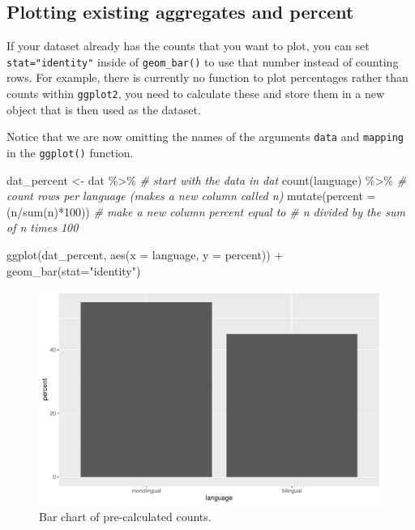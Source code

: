 \documentclass[
  english,
  doc,floatsintext]{apa6}
\newenvironment{Shaded}{\begin{snugshade}}{\end{snugshade}}
\newcommand{\AttributeTok}[1]{\textcolor[rgb]{0.77,0.63,0.00}{#1}}
\newcommand{\CommentTok}[1]{\textcolor[rgb]{0.56,0.35,0.01}{\textit{#1}}}
\newcommand{\DecValTok}[1]{\textcolor[rgb]{0.00,0.00,0.81}{#1}}
\newcommand{\FunctionTok}[1]{\textcolor[rgb]{0.00,0.00,0.00}{#1}}
\newcommand{\NormalTok}[1]{#1}
\newcommand{\OtherTok}[1]{\textcolor[rgb]{0.56,0.35,0.01}{#1}}
\newcommand{\SpecialCharTok}[1]{\textcolor[rgb]{0.00,0.00,0.00}{#1}}
\newcommand{\StringTok}[1]{\textcolor[rgb]{0.31,0.60,0.02}{#1}}
\begin{document}
\hypertarget{plotting-existing-aggregates-and-percent}{%
\subsection{Plotting existing aggregates and percent}\label{plotting-existing-aggregates-and-percent}}

If your dataset already has the counts that you want to plot, you can set \texttt{stat="identity"} inside of \texttt{geom\_bar()} to use that number instead of counting rows. For example, there is currently no function to plot percentages rather than counts within \texttt{ggplot2}, you need to calculate these and store them in a new object that is then used as the dataset.

Notice that we are now omitting the names of the arguments \texttt{data} and \texttt{mapping} in the \texttt{ggplot()} function.

\begin{Shaded}
\begin{Highlighting}[]
\NormalTok{dat\_percent }\OtherTok{\textless{}{-}}\NormalTok{ dat }\SpecialCharTok{\%\textgreater{}\%}    \CommentTok{\# start with the data in dat}
  \FunctionTok{count}\NormalTok{(language) }\SpecialCharTok{\%\textgreater{}\%}     \CommentTok{\# count rows per language (makes a new column called n)}
  \FunctionTok{mutate}\NormalTok{(}\AttributeTok{percent =}\NormalTok{ (n}\SpecialCharTok{/}\FunctionTok{sum}\NormalTok{(n)}\SpecialCharTok{*}\DecValTok{100}\NormalTok{)) }\CommentTok{\# make a new column \textquotesingle{}percent\textquotesingle{} equal to }
                                   \CommentTok{\# n divided by the sum of n times 100}

\FunctionTok{ggplot}\NormalTok{(dat\_percent, }\FunctionTok{aes}\NormalTok{(}\AttributeTok{x =}\NormalTok{ language, }\AttributeTok{y =}\NormalTok{ percent)) }\SpecialCharTok{+}
  \FunctionTok{geom\_bar}\NormalTok{(}\AttributeTok{stat=}\StringTok{"identity"}\NormalTok{) }
\end{Highlighting}
\end{Shaded}

\begin{figure}

{\centering \includegraphics[width=1\linewidth]{images/bar-precalc-1} 

}

\caption{Bar chart of pre-calculated counts.}\label{fig:bar-precalc}
\end{figure}
\end{document}
